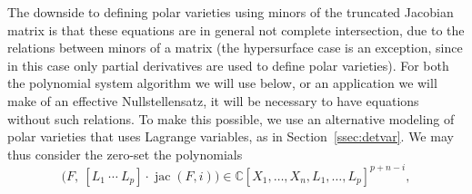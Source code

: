 \documentclass[12pt]{article}
\DeclareMathOperator{\jac}{jac}
\def\C{\mathbb{C}}
\newtheorem{ex}[theorem]{Example}
\begin{document}
The downside to defining polar varieties using minors of the truncated
Jacobian matrix is that these equations are in general not complete
intersection, due to the relations between minors of a matrix (the
hypersurface case is an exception, since in this case only partial
derivatives are used to define polar varieties). For both the
polynomial system algorithm we will use below, or an application we
will make of an effective Nullstellensatz, it will be necessary to
have equations without such relations. To make this possible, we use
an alternative modeling of polar varieties that uses Lagrange
variables, as in Section~\ref{ssec:detvar}. We may thus consider the zero-set the polynomials
\[ \big(F,\ [L_1~\cdots~L_p]\cdot \jac(F, i)\big ) \in \C[X_1,\dots,X_n,L_1,\dots,L_p]^{p+n-i},\]
\end{document}
